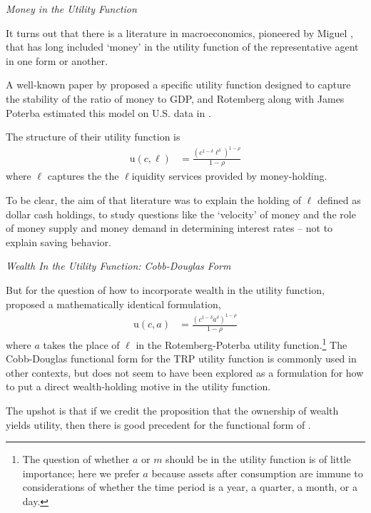 \documentclass{article}
\newcommand{\CRRA}{\rho}
\newcommand{\uFunc}{\mathrm{u}}
\newcommand{\cNrm}{c}
\newcommand{\aNrm}{a}
\newcommand{\mNrm}{m}
\newcommand{\lqdt}{\ell}
\begin{document}
\textit{Money in the Utility Function}

It turns out that there is a literature in macroeconomics, pioneered by Miguel \cite{sidrauski1967rational}, that has long included `money' in the utility function of the representative agent in one form or another.

A well-known paper by \cite{Rotemberg_1984} proposed a specific utility function designed to capture the stability of the ratio of money to GDP, and Rotemberg along with James Poterba estimated this model on U.S. data in \cite{Poterba_1986}.

The structure of their utility function is
\begin{align}
    \uFunc(\cNrm,\lqdt) & = \frac{\left(
        \cNrm^{1-\delta}\lqdt^{\delta}
        \right)^{1-\CRRA}}{1-\CRRA}
\end{align}
where $\lqdt$ captures the the $\lqdt$iquidity services provided by money-holding.

To be clear, the aim of that literature was to explain the holding of $\lqdt$ defined as dollar cash holdings, to study questions like the `velocity' of money and the role of money supply and money demand in determining interest rates -- not to explain saving behavior.

\textit{Wealth In the Utility Function: Cobb-Douglas Form}

But for the question of how to incorporate wealth in the utility function, \cite{Tzitzouris_2024} proposed a mathematically identical formulation,
\begin{align}
    \uFunc(\cNrm,\aNrm) & = \frac{\left(
        \cNrm^{1-\delta}\aNrm^{\delta}
        \right)^{1-\CRRA}}{1-\CRRA}
\end{align}
where $\aNrm$ takes the place of $\lqdt$ in the Rotemberg-Poterba utility function.\footnote{The question of whether $\aNrm$ or $\mNrm$ should be in the utility function is of little importance; here we prefer $\aNrm$ because assets after consumption are immune to considerations of whether the time period is a year, a quarter, a month, or a day.} The Cobb-Douglas functional form for the TRP utility function is commonly used in other contexts, but does not seem to have been explored as a formulation for how to put a direct wealth-holding motive in the utility function.

The upshot is that if we credit the proposition that the ownership of wealth yields utility, then there is good precedent for the functional form of \cite{Tzitzouris_2024}.
\end{document}
